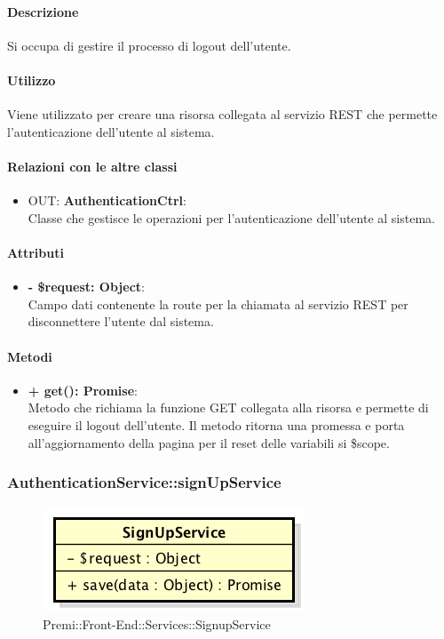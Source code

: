 		\paragraph{Descrizione}
		Si occupa di gestire il processo di logout dell'utente.
		
		\paragraph{Utilizzo}
		Viene utilizzato per creare una risorsa collegata al servizio \gls{REST} che permette l'autenticazione dell'utente al sistema.
		
		\paragraph{Relazioni con le altre classi}
		\begin{itemize}
			\item OUT: \textbf{AuthenticationCtrl}:\\
			Classe che gestisce le operazioni per l'autenticazione dell'utente al sistema.
		\end{itemize}
		
		\paragraph{Attributi}
		\begin{itemize}
			\item \textbf{- \$request: Object}:\\
			Campo dati contenente la route per la chiamata al servizio \gls{REST}  per disconnettere l'utente dal sistema.
		\end{itemize}	
		
		\paragraph{Metodi}
		\begin{itemize}
			\item \textbf{+ get(): Promise}:\\
			Metodo che richiama la funzione GET collegata alla risorsa e permette di eseguire il logout dell'utente. Il metodo ritorna una promessa e porta all'aggiornamento della pagina per il reset delle variabili si \$scope.
		\end{itemize}
\newpage
		
		
		\subsubsection{AuthenticationService::signUpService}
		\begin{figure}[h]
			\centering
				\includegraphics[width=0.4\linewidth]{img/premi_front_end_services_signupservice}
			\caption[Premi::Front-End::Services::SignupService]{Premi::Front-End::Services::SignupService}
		\end{figure}
		
